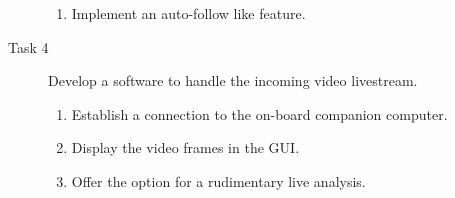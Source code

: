\begin{description}
\begin{enumerate}
        \item Implement an auto-follow like feature.
    \end{enumerate}
    \item[Task 4] Develop a software to handle the incoming video livestream.
    \begin{enumerate}
        \item Establish a connection to the on-board companion computer.
        \item Display the video frames in the \acs*{GUI}.
        \item Offer the option for a rudimentary live analysis.
    \end{enumerate}
\end{description}
